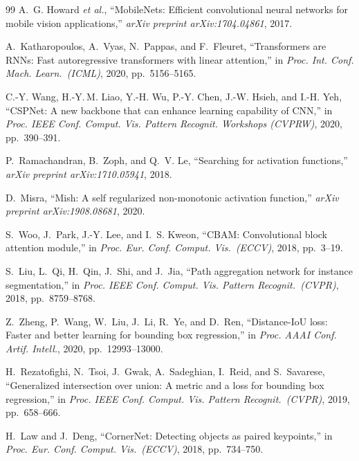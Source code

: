 \documentclass[conference]{IEEEtran}
\begin{document}
\begin{thebibliography}{99}
A.~G. Howard \textit{et al.}, ``MobileNets: Efficient convolutional
neural networks for mobile vision applications,'' \textit{arXiv
preprint arXiv:1704.04861}, 2017.

A.~Katharopoulos, A.~Vyas, N.~Pappas, and F.~Fleuret, ``Transformers
are RNNs: Fast autoregressive transformers with linear attention,'' in
\textit{Proc. Int. Conf. Mach. Learn.\ (ICML)}, 2020,
pp.~5156--5165.

C.-Y. Wang, H.-Y.\,M. Liao, Y.-H. Wu, P.-Y. Chen, J.-W. Hsieh, and
I.-H. Yeh, ``CSPNet: A new backbone that can enhance learning
capability of CNN,'' in \textit{Proc. IEEE Conf. Comput. Vis.
Pattern Recognit. Workshops (CVPRW)}, 2020, pp.~390--391.

P.~Ramachandran, B.~Zoph, and Q.~V. Le, ``Searching for activation
functions,'' \textit{arXiv preprint arXiv:1710.05941}, 2018.

D.~Misra, ``Mish: A self regularized non-monotonic activation
function,'' \textit{arXiv preprint arXiv:1908.08681}, 2020.

S.~Woo, J.~Park, J.-Y. Lee, and I.~S. Kweon, ``CBAM: Convolutional
block attention module,'' in \textit{Proc. Eur. Conf. Comput. Vis.\
(ECCV)}, 2018, pp.~3--19.

S.~Liu, L.~Qi, H.~Qin, J.~Shi, and J.~Jia, ``Path aggregation
network for instance segmentation,'' in \textit{Proc. IEEE Conf.
Comput. Vis. Pattern Recognit.\ (CVPR)}, 2018, pp.~8759--8768.

Z.~Zheng, P.~Wang, W.~Liu, J.~Li, R.~Ye, and D.~Ren, ``Distance-IoU
loss: Faster and better learning for bounding box regression,'' in
\textit{Proc. AAAI Conf. Artif. Intell.}, 2020,
pp.~12993--13000.

H.~Rezatofighi, N.~Tsoi, J.~Gwak, A.~Sadeghian, I.~Reid, and
S.~Savarese, ``Generalized intersection over union: A metric and a
loss for bounding box regression,'' in \textit{Proc. IEEE Conf.
Comput. Vis. Pattern Recognit.\ (CVPR)}, 2019, pp.~658--666.

H.~Law and J.~Deng, ``CornerNet: Detecting objects as paired
keypoints,'' in \textit{Proc. Eur. Conf. Comput. Vis.\ (ECCV)},
2018, pp.~734--750.

\end{thebibliography}
\end{document}
